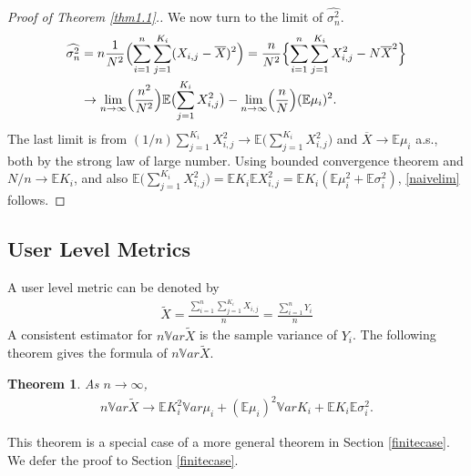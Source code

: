 \documentclass[10pt]{article}
\newcommand{\wX}{\widetilde{X}}
\newcommand{\wht}{\widehat}
\newcommand{\var}{\ensuremath{\mathbb Var}}
\newcommand{\bbe}{\mathbb{E}}
\newcommand{\xbar}{\overline{X}}
\newcommand{\Xij}{X_{i,j}}
\newcommand{\naiveest}{\wht{\sigma^2_n}}
\newtheorem{thm}{Theorem}
\begin{document}
\begin{proof}[Proof of Theorem \ref{thm1.1}.]
We now turn to the limit of $\naiveest$. 
\begin{align*}
 \naiveest &= n \frac{1}{N^2} \Bigl (\sum_{i=1}^n \sum_{j=1}^{K_i} (X_{i,j}-\overline{X})^2 \Bigr )= \frac{n}{N^2} \Bigl \{  \sum_{i=1}^n \sum_{j=1}^{K_i} X_{i,j}^2 - N \xbar^2 \Bigr\}\\
&\to   \lim_{n\to \infty} \Bigl(\frac{n^2}{N^2}\Bigr) \bbe \bigl(\sum_{j=1}^{K_i} \Xij^2 \bigr) -   \lim_{n\to \infty} \Bigl(\frac{n}{N}\Bigr) (\bbe \mu_i)^2 .
\end{align*}
The last limit is from $(1/n) \sum_{j=1}^{K_i} X_{i,j}^2 \to \bbe \bigl(\sum_{j=1}^{K_i} \Xij^2 \bigr)$ and $\xbar \to \bbe \mu_i$ a.s., both by the strong law of large number.
Using bounded convergence theorem and $N/n \to \bbe K_i$, and also $\bbe \bigl(\sum_{j=1}^{K_i} \Xij^2 \bigr)  = \bbe K_i \bbe X_{i,j}^2 = \bbe K_i (\bbe \mu_i^2 + \bbe \sigma_i^2)$,
\eqref{naivelim} follows.
\end{proof}

\subsection{User Level Metrics}
A user level metric can be denoted by 
\begin{align*} 
\wX = \frac{\sum_{i=1}^n\sum_{j=1}^{K_i} X_{i,j}}{n} = \frac{\sum_{i=1}^n Y_i}{n}
\end{align*}
A consistent estimator for $n\var \wX$ is the sample variance of $Y_i$. The following theorem gives the formula of $n\var \wX$. 
\begin{thm}\label{thm1.2} 
As $n\to \infty$, 
\begin{align*}
n\var \wX \to \bbe K_i^2 \var \mu_i + (\bbe \mu_i)^2 \var K_i + \bbe K_i \bbe \sigma_i^2.
\end{align*} 
\end{thm}
This theorem is a special case of a more general theorem in Section \ref{finitecase}. We defer the proof to Section \ref{finitecase}.
\end{document}
